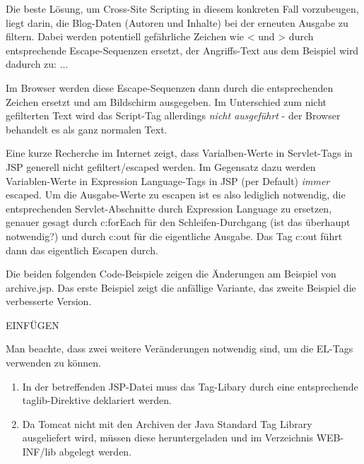 Die beste Lösung, um Cross-Site Scripting in diesem konkreten Fall vorzubeugen, liegt darin, die Blog-Daten (Autoren und Inhalte) bei der erneuten Ausgabe zu filtern. Dabei werden potentiell gefährliche Zeichen wie < und > durch entsprechende Escape-Sequenzen ersetzt, der Angriffs-Text aus dem Beispiel wird dadurch zu: ...

Im Browser werden diese Escape-Sequenzen dann durch die entsprechenden Zeichen ersetzt und am Bildschirm ausgegeben. Im Unterschied zum nicht gefilterten Text wird das Script-Tag allerdings \emph{nicht ausgeführt} - der Browser behandelt es als ganz normalen Text.

Eine kurze Recherche im Internet zeigt, dass Varialben-Werte in Servlet-Tags in JSP generell nicht gefiltert/escaped werden. Im Gegensatz dazu werden Variablen-Werte in Expression Language-Tags in JSP (per Default) \emph{immer} escaped. Um die Ausgabe-Werte zu escapen ist es also lediglich notwendig, die entsprechenden Servlet-Abschnitte durch Expression Language zu ersetzen, genauer gesagt durch c:forEach für den Schleifen-Durchgang (ist das überhaupt notwendig?) und durch c:out für die eigentliche Ausgabe. Das Tag c:out führt dann das eigentlich Escapen durch.

Die beiden folgenden Code-Beispiele zeigen die Änderungen am Beispiel von archive.jsp. Das erste Beispiel zeigt die anfällige Variante, das zweite Beispiel die verbesserte Version.

EINFÜGEN

Man beachte, dass zwei weitere Veränderungen notwendig sind, um die EL-Tags verwenden zu können.
\begin{enumerate}
\item In der betreffenden JSP-Datei muss das Tag-Libary durch eine entsprechende taglib-Direktive deklariert werden. 
\item Da Tomcat nicht mit den Archiven der Java Standard Tag Library ausgeliefert wird, müssen diese heruntergeladen und im Verzeichnis WEB-INF/lib abgelegt werden.
\end{enumerate}

